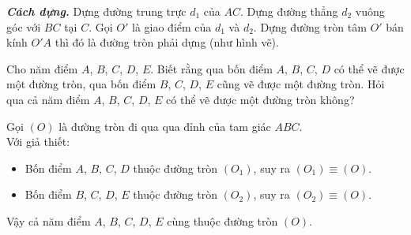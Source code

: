 \begin{bt}
{\begin{enumerate}
{   \textbf{\textit{Cách dựng.}} Dựng đường trung trực $d_1$ của $AC$. Dựng đường thẳng $d_2$ vuông góc với $BC$ tại $C$. Gọi $O'$ là giao điểm của $d_1$ và $d_2$. Dựng đường tròn tâm $O'$ bán kính $O'A$ thì đó là đường tròn phải dựng (như hình vẽ).
   }
   {
   }
  \end{enumerate}
  }
\end{bt}

\begin{bt}
 Cho năm điểm $A$, $B$, $C$, $D$, $E$. Biết rằng qua bốn điểm $A$, $B$, $C$, $D$ có thể vẽ được một đường tròn, qua bốn điểm $B$, $C$, $D$, $E$ cũng vẽ được một đường tròn. Hỏi qua cả năm điểm $A$, $B$, $C$, $D$, $E$ có thể vẽ được một đường tròn không?
 \loigiai
  {
  Gọi $(O)$ là đường tròn đi qua qua đỉnh của tam giác $ABC$.\\
  Với giả thiết:
  \begin{itemize}
   \item Bốn điểm $A$, $B$, $C$, $D$ thuộc đường tròn $(O_1)$, suy ra $(O_1)\equiv (O)$.
   \item Bốn điểm $B$, $C$, $D$, $E$ thuộc đường tròn $(O_2)$, suy ra $(O_2)\equiv (O)$.
  \end{itemize}
  Vậy cả năm điểm $A$, $B$, $C$, $D$, $E$ cùng thuộc đường tròn $(O)$.
  }
\end{bt}

